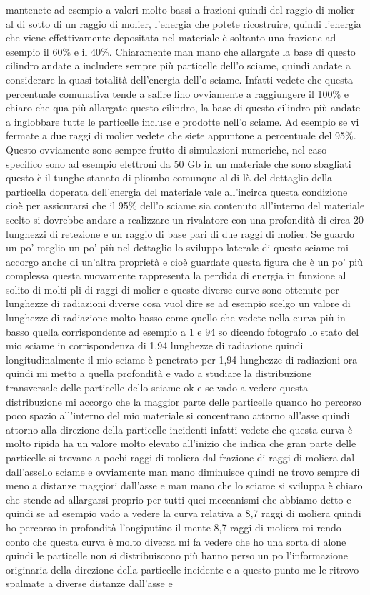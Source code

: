 {mantenete ad esempio a valori molto bassi a frazioni quindi del raggio di molier al di sotto di un raggio di molier, l'energia che potete ricostruire, quindi l'energia che viene effettivamente depositata nel materiale è soltanto una frazione ad esempio il 60\% e il 40\%. Chiaramente man mano che allargate la base di questo cilindro andate a includere sempre più particelle dell'o sciame, quindi andate a considerare la quasi totalità dell'energia dell'o sciame. Infatti vedete che questa percentuale comunativa tende a salire fino ovviamente a raggiungere il 100\% e chiaro che qua più allargate questo cilindro, la base di questo cilindro più andate a inglobbare tutte le particelle incluse e prodotte nell'o sciame. Ad esempio se vi fermate a due raggi di molier vedete che siete appuntone a percentuale del 95\%. Questo ovviamente sono sempre frutto di simulazioni numeriche, nel caso specifico sono ad esempio elettroni da 50 Gb in un materiale che sono sbagliati questo è il tunghe stanato di pliombo comunque al di là del dettaglio della particella doperata dell'energia del materiale vale all'incirca questa condizione cioè per assicurarsi che il 95\% dell'o sciame sia contenuto all'interno del materiale scelto si dovrebbe andare a realizzare un rivalatore con una profondità di circa 20 lunghezzi di retezione e un raggio di base pari di due raggi di molier. Se guardo un po' meglio un po' più nel dettaglio lo sviluppo laterale di questo sciame mi accorgo anche di un'altra proprietà e cioè guardate questa figura che è un po' più complessa questa nuovamente rappresenta la perdida di energia in funzione al solito di molti pli di raggi di molier e queste diverse curve sono ottenute per lunghezze di radiazioni diverse cosa vuol dire se ad esempio scelgo un valore di lunghezze di radiazione molto basso come quello che vedete nella curva più in basso quella corrispondente ad esempio a 1 e 94 so dicendo fotografo lo stato del mio sciame in corrispondenza di 1,94 lunghezze di radiazione quindi longitudinalmente il mio sciame è penetrato per 1,94 lunghezze di radiazioni ora quindi mi metto a quella profondità e vado a studiare la distribuzione transversale delle particelle dello sciame ok e se vado a vedere questa distribuzione mi accorgo che la maggior parte delle particelle quando ho percorso poco spazio all'interno del mio materiale si concentrano attorno all'asse quindi attorno alla direzione della particelle incidenti infatti vedete che questa curva è molto ripida ha un valore molto elevato all'inizio che indica che gran parte delle particelle si trovano a pochi raggi di moliera dal frazione di raggi di moliera dal dall'assello sciame e ovviamente man mano diminuisce quindi ne trovo sempre di meno a distanze maggiori dall'asse e man mano che lo sciame si sviluppa è chiaro che stende ad allargarsi proprio per tutti quei meccanismi che abbiamo detto e quindi se ad esempio vado a vedere la curva relativa a 8,7 raggi di moliera quindi ho percorso in profondità l'ongiputino il mente 8,7 raggi di moliera mi rendo conto che questa curva è molto diversa mi fa vedere che ho una sorta di alone quindi le particelle non si distribuiscono più hanno perso un po l'informazione originaria della direzione della particelle incidente e a questo punto me le ritrovo spalmate a diverse distanze dall'asse e }
